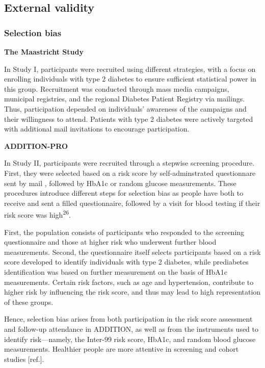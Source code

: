 \documentclass[
  a4paper,
  headsepline=true,
  open=any]{scrbook}
\begin{document}
\hypertarget{external-validity}{%
\subsection{External validity}\label{external-validity}}

\hypertarget{selection-bias}{%
\subsubsection{Selection bias}\label{selection-bias}}

\textbf{The Maastricht Study}

In Study I, participants were recruited using different strategies, with
a focus on enrolling individuals with type 2 diabetes to ensure
sufficient statistical power in this group. Recruitment was conducted
through mass media campaigns, municipal registries, and the regional
Diabetes Patient Registry via mailings. Thus, participation depended on
individuals' awareness of the campaigns and their willingness to attend.
Patients with type 2 diabetes were actively targeted with additional
mail invitations to encourage participation.

\textbf{ADDITION-PRO}

In Study II, participants were recruited through a stepwise screening
procedure. First, they were selected based on a risk score by
self-adminstrated questionnare sent by mail , followed by HbA1c or
random glucose measurements. These procedures introduce different steps
for selection bias as people have both to receive and sent a filled
questionnaire, followed by a visit for blood testing if their risk score
was high\textsuperscript{26}.

First, the population consists of participants who responded to the
screening questionnaire and those at higher risk who underwent further
blood measurements. Second, the questionnaire itself selects
participants based on a risk score developed to identify individuals
with type 2 diabetes, while prediabetes identification was based on
further measurement on the basis of HbA1c measurements. Certain risk
factors, such as age and hypertension, contribute to higher risk by
influencing the risk score, and thus may lead to high representation of
these groups.

Hence, selection bias arises from both participation in the risk score
assessment and follow-up attendance in ADDITION, as well as from the
instruments used to identify risk---namely, the Inter-99 risk score,
HbA1c, and random blood glucose measurements. Healthier people are more
attentive in screening and cohort studies {[}ref.{]}.
\end{document}
